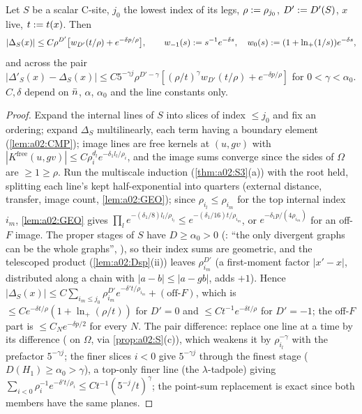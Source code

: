 \begin{lemma}\label{lem:a02:K18}
Let $S$ be a scalar C-site, $j_0$ the lowest index of its legs, $\rho:=\rho_{j_0}$, $D':= D'(S)$, $x$ live, $t:= t(x)$. Then
\[
|\Delta_S(x)|\le C\rho^{D'}\big[w_{D'}(t/\rho)+e^{-\delta p/\rho}\big],\qquad w_{-1}(s):= s^{-1}e^{-\delta s},\quad w_0(s):=(1+\ln_+(1/s))e^{-\delta s},
\]
and across the pair $|\Delta'_S(x)-\Delta_S(x)|\le C5^{-\gamma j}\rho^{D'-\gamma}[(\rho/t)^\gamma w_{D'}(t/\rho)+e^{-\delta p/\rho}]$ for $0<\gamma<\alpha_0$. $C,\delta$ depend on $\bar n$, $\alpha$, $\alpha_0$ and the line constants only.
\end{lemma}
\begin{proof}
Expand the internal lines of $S$ into slices of index $\le j_0$ and fix an ordering; expand $\Delta_S$ multilinearly, each term having a boundary element (\cref{lem:a02:CMP}); image lines are free kernels at $(u,gv)$ with $|K^{\mathrm{free}}(u,gv)|\le C\rho_i^{d_l}e^{-\delta_1l_l/\rho_i}$, and the image sums converge since the sides of $\Omega$ are $\ge1\ge\rho$. Run the multiscale induction (\cref{thm:a02:S3}(a)) with the root held, splitting each line's kept half-exponential into quarters (external distance, transfer, image count, \cref{lem:a02:GEO}); since $\rho_{i_l}\le\rho_{i_m}$ for the top internal index $i_m$, \cref{lem:a02:GEO} gives $\prod_le^{-(\delta_1/8)l_l/\rho_{i_l}}\le e^{-(\delta_1/16)t/\rho_{i_m}}$, or $e^{-\delta_1p/(4\rho_{i_m})}$ for an off-$F$ image. The proper stages of $S$ have $D\ge\alpha_0>0$ (\DEG: ``the only divergent graphs can be the whole graphs'', \cite[p.~445]{Ba3}), so their index sums are geometric, and the telescoped product (\cref{lem:a02:Dsp}(ii)) leaves $\rho_{i_m}^{D'}$ (a first-moment factor $|x'-x|$, distributed along a chain with $|a-b|\le|a-gb|$, adds $+1$). Hence $|\Delta_S(x)|\le C\sum_{i_m\le j_0}\rho_{i_m}^{D'}e^{-\delta't/\rho_{i_m}}+(\text{off-}F)$, which is $\le Ce^{-\delta t/\rho}(1+\ln_+(\rho/t))$ for $D'=0$ and $\le Ct^{-1}e^{-\delta t/\rho}$ for $D'=-1$; the off-$F$ part is $\le C_Ne^{-\delta p/2}$ for every $N$. The pair difference: replace one line at a time by its difference (\cite[Props.~3.8--3.9]{K1} on $\Omega$, via \cref{prop:a02:S}(c)), which weakens it by $\rho_{i_l}^{-\gamma}$ with the prefactor $5^{-\gamma j}$; the finer slices $i<0$ give $5^{-\gamma j}$ through the finest stage ($D(H_1)\ge\alpha_0>\gamma$), a top-only finer line (the $\lambda$-tadpole) giving $\sum_{i<0}\rho_i^{-1}e^{-\delta't/\rho_i}\le Ct^{-1}(5^{-j}/t)^\gamma$; the point-sum replacement is exact since both members have the same planes.
\end{proof}

